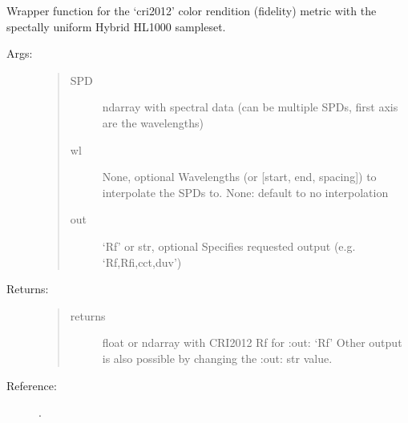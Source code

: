 \documentclass[letterpaper,10pt,english]{sphinxmanual}
\begin{document}
\begin{fulllineitems}
\label{\detokenize{color:luxpy.color.cri.spd_to_cri2012_hl1000}}
Wrapper function for the ‘cri2012’ color rendition (fidelity) metric
with the spectally uniform Hybrid HL1000 sampleset.
\begin{description}
\item[{Args:}] \leavevmode\begin{quote}\begin{description}
\item[{SPD}] \leavevmode
ndarray with spectral data (can be multiple SPDs, 
first axis are the wavelengths)

\item[{wl}] \leavevmode
None, optional
Wavelengths (or {[}start, end, spacing{]}) to interpolate the SPDs to. 
None: default to no interpolation

\item[{out}] \leavevmode
‘Rf’ or str, optional
Specifies requested output (e.g. ‘Rf,Rfi,cct,duv’)

\end{description}\end{quote}

\item[{Returns:}] \leavevmode\begin{quote}\begin{description}
\item[{returns}] \leavevmode
float or ndarray with CRI2012 Rf for :out: ‘Rf’
Other output is also possible by changing the :out: str value.

\end{description}\end{quote}

\item[{Reference:}] . 

\end{description}

\end{fulllineitems}

\end{document}
